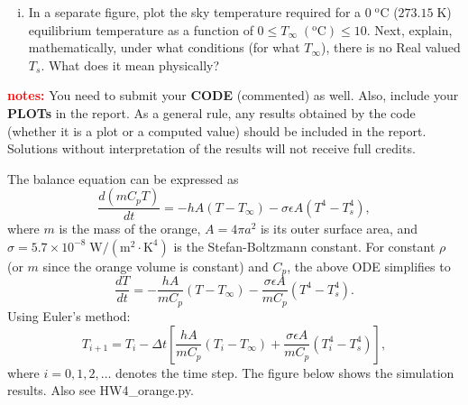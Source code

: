 \documentclass[12pt]{article}
\begin{document}
\begin{ex}
\begin{enumerate}[(i)]
  \item In a separate figure, plot the sky temperature required for a $0\;\mathrm{^oC}$ ($273.15\;\mathrm{K}$) equilibrium temperature as a function of $0\le T_{\infty}\;(\mathrm{^oC})\le10$. Next, explain, mathematically, under what conditions (for what $T_{\infty}$), there is no Real valued $T_s$. What does it mean physically?
  \end{enumerate}
\noindent\textbf{\textcolor{red}{notes:} }You need to submit your \textbf{CODE} (commented) as well. Also, include your \textbf{PLOTs} in the report. As a general rule, any results obtained by the code (whether it is a plot or a computed value) should be included in the report. Solutions without interpretation of the results will not receive full credits.

\begin{solution}
  The balance equation can be expressed as
  $$\frac{d(mC_pT)}{dt}=-hA(T-T_{\infty})-\sigma\epsilon A(T^4-T_s^4),$$
  where $m$ is the mass of the orange, $A=4\pi a^2$ is its outer surface area, and $\sigma=5.7\times10^{-8}\;\mathrm{W/(m^2\cdot K^4)}$ is the Stefan-Boltzmann constant. For constant $\rho$ (or $m$ since the orange volume is constant) and $C_p$, the above ODE simplifies to
  $$\frac{dT}{dt}=-\frac{hA}{mC_p}(T-T_{\infty})-\frac{\sigma\epsilon A}{mC_p}\left(T^4-T_s^4\right).$$
  Using Euler's method:
  $$T_{i+1}=T_i-\Delta t\left[\frac{hA}{mC_p}(T_i-T_{\infty})+\frac{\sigma\epsilon A}{mC_p}\left(T_i^4-T_s^4\right)\right],$$
  where $i=0,1,2,\dots$ denotes the time step. The figure below shows the simulation results. Also see HW4\_orange.py.
  \begin{figure}[h]
  \centering
  \end{figure}


\end{solution}
\end{ex}
\end{document}
